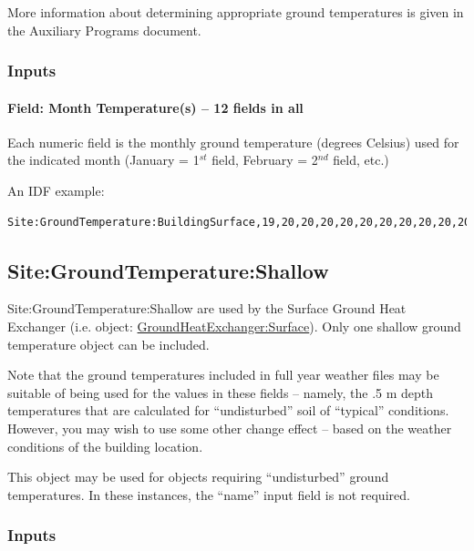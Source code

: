 More information about determining appropriate ground temperatures is given in the Auxiliary Programs document.

\subsubsection{Inputs}\label{inputs-11-008}

\paragraph{Field: Month Temperature(s) -- 12 fields in all}\label{field-month-temperatures-12-fields-in-all}

Each numeric field is the monthly ground temperature (degrees Celsius) used for the indicated month (January = 1\(^{st}\) field, February = 2\(^{nd}\) field, etc.)

An IDF example:

\begin{lstlisting}
Site:GroundTemperature:BuildingSurface,19,20,20,20,20,20,20,20,20,20,20,20;
\end{lstlisting}

\subsection{Site:GroundTemperature:Shallow}\label{sitegroundtemperatureshallow}

Site:GroundTemperature:Shallow are used by the Surface Ground Heat Exchanger (i.e. object: \hyperref[groundheatexchangersurface]{GroundHeatExchanger:Surface}). Only one shallow ground temperature object can be included.

\begin{callout}
Note that the ground temperatures included in full year weather files may be suitable of being used for the values in these fields -- namely, the .5 m depth temperatures that are calculated for ``undisturbed'' soil of ``typical'' conditions. However, you may wish to use some other change effect -- based on the weather conditions of the building location.
\end{callout}

This object may be used for objects requiring ``undisturbed'' ground temperatures. In these instances, the ``name'' input field is not required.

\subsubsection{Inputs}\label{inputs-12-008}

